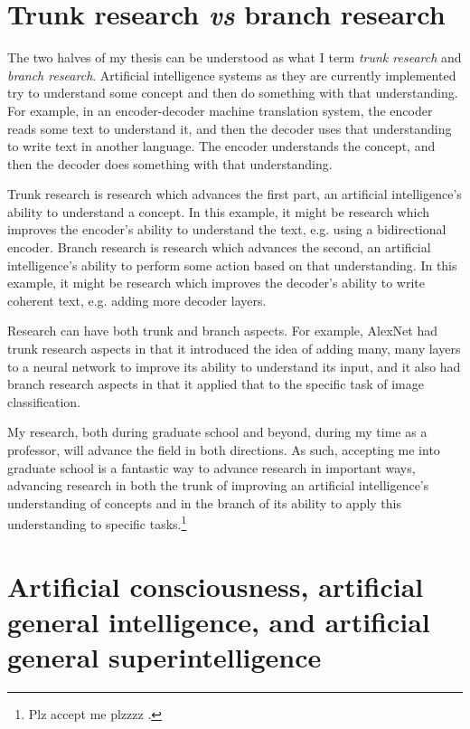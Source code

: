 \documentclass[12pt]{report}
\begin{document}
\section{Trunk research \textit{vs} branch research}
The two halves of my thesis can be understood as what I term \textit{trunk research} and \textit{branch research}.
Artificial intelligence systems as they are currently implemented try to understand some concept and then do something with that understanding.
For example, in an encoder-decoder machine translation system, the encoder reads some text to understand it, and then the decoder uses that understanding to write text in another language.
The encoder understands the concept, and then the decoder does something with that understanding.

Trunk research is research which advances the first part, an artificial intelligence's ability to understand a concept.
In this example, it might be research which improves the encoder's ability to understand the text, e.g. using a bidirectional encoder.
Branch research is research which advances the second, an artificial intelligence's ability to perform some action based on that understanding.
In this example, it might be research which improves the decoder's ability to write coherent text, e.g. adding more decoder layers.

Research can have both trunk and branch aspects.
For example, AlexNet \cite{Krizhevsky2012-qe} had trunk research aspects in that it introduced the idea of adding many, many layers to a neural network to improve its ability to understand its input, and it also had branch research aspects in that it applied that to the specific task of image classification.

My research, both during graduate school and beyond, during my time as a professor, will advance the field in both directions.
As such, accepting me into graduate school is a fantastic way to advance research in important ways, advancing research in both the trunk of improving an artificial intelligence's understanding of concepts and in the branch of its ability to apply this understanding to specific tasks.\footnote{Plz accept me plzzzz .}

\section{Artificial consciousness, artificial general intelligence, and artificial general superintelligence}
\end{document}

